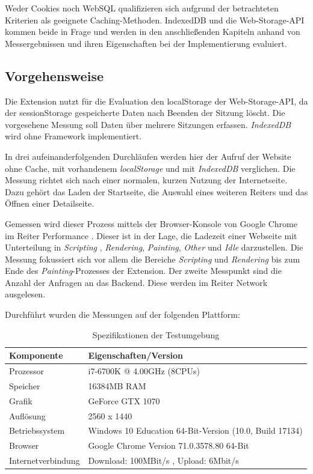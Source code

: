 Weder Cookies noch WebSQL qualifizieren sich aufgrund der betrachteten Kriterien als geeignete Caching-Methoden. IndexedDB und die Web-Storage-API kommen beide in Frage und werden in den anschließenden Kapiteln anhand von Messergebnissen und ihren Eigenschaften bei der Implementierung evaluiert.

\subsection{Vorgehensweise}
\label{ss:vorgehensweise}

Die Extension nutzt für die Evaluation den \glqq localStorage\grqq{} der Web-Storage-API, da der \glqq sessionStorage \grqq{} gespeicherte Daten nach Beenden der Sitzung löscht. Die vorgesehene Messung soll Daten über mehrere Sitzungen erfassen. \textit{IndexedDB} wird ohne Framework implementiert.

In drei aufeinanderfolgenden Durchläufen werden hier der Aufruf der Website ohne Cache, mit vorhandenem \textit{localStorage} und mit \textit{IndexedDB} verglichen. Die Messung richtet sich nach einer normalen, kurzen Nutzung der Internetseite. Dazu gehört das Laden der Startseite, die Auswahl eines weiteren Reiters und das Öffnen einer Detailseite. 

Gemessen wird dieser Prozess mittels der Browser-Konsole von Google Chrome im Reiter \glqq Performance \grqq{}. Dieser ist in der Lage, die Ladezeit einer Webseite mit Unterteilung in \textit{Scripting} , \textit{Rendering}, \textit{Painting}, \textit{Other} und \textit{Idle} darzustellen. Die Messung fokussiert sich vor allem die Bereiche \textit{Scripting} und \textit{Rendering} bis zum Ende des \textit{Painting}-Prozesses der Extension. Der zweite Messpunkt sind die Anzahl der Anfragen an das Backend. Diese werden im Reiter \glqq Network \grqq ausgelesen.

Durchführt wurden die Messungen auf der folgenden Plattform:
\begin{table}[h]
	\begin{tabular}{p{4.6cm}R{7.0cm}}
		\toprule
		\textbf{Komponente}	&	\textbf{Eigenschaften/Version}	\\
		\midrule
		Prozessor	&	i7-6700K @ 4.00GHz (8CPUs)	\\
		Speicher	&	16384MB RAM	\\
		Grafik	&	GeForce GTX 1070	\\
		Auflösung	&	2560 x 1440	\\
		\midrule
		Betriebssystem	&	Windows 10 Education 64-Bit-Version (10.0, Build 17134)	\\
		Browser	&	Google Chrome Version 71.0.3578.80 64-Bit	\\
		Internetverbindung	&	Download: 100MBit/s , Upload: 6Mbit/s	\\
		\bottomrule
	\end{tabular}
	\caption{Spezifikationen der Testumgebung}
	\label{cache3}
\end{table}

